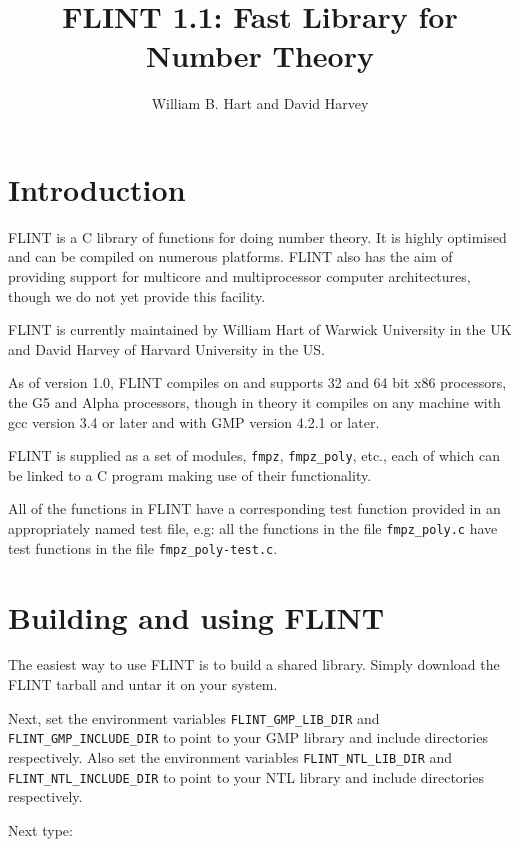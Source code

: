 \documentclass[a4paper,10pt]{article}
\title{FLINT 1.1: Fast Library for Number Theory}
\author{William B. Hart and David Harvey}
\newcommand{\code}{\lstinline}
\begin{document}
\maketitle
\tableofcontents
\lstset{language=c}
\lstset{basicstyle=\ttfamily}
\lstset{keywordstyle=}
\lstset{escapeinside=\%\%}

\section{Introduction}

FLINT is a C library of functions for doing number theory. It is highly optimised and can be compiled on numerous platforms. FLINT also has the aim of providing support for multicore and multiprocessor computer architectures, though we do not yet provide this facility.

FLINT is currently maintained by William Hart of Warwick University in the UK and David Harvey of Harvard University in the US.

As of version 1.0, FLINT compiles on and supports 32 and 64 bit x86 processors, the G5 and Alpha processors, though in theory it compiles on any machine with gcc version 3.4 or later and with GMP version 4.2.1 or later.

FLINT is supplied as a set of modules, \code{fmpz}, \code{fmpz_poly}, etc., each of which can be linked to a C program making use of their functionality. 

All of the functions in FLINT have a corresponding test function provided in an appropriately named test file, e.g: all the functions in the file \code{fmpz_poly.c} have test functions in the file \code{fmpz_poly-test.c}.

\section{Building and using FLINT}

The easiest way to use FLINT is to build a shared library. Simply download the FLINT tarball and untar it on your system.

Next, set the environment variables \code{FLINT_GMP_LIB_DIR} and \code{FLINT_GMP_INCLUDE_DIR} to point to your GMP library and include directories respectively. Also set the environment variables \code{FLINT_NTL_LIB_DIR} and \code{FLINT_NTL_INCLUDE_DIR} to point to your NTL library and include directories respectively. 

Next type:
\end{document}
